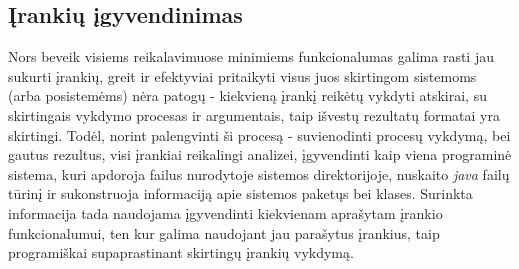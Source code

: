 \subsection{Įrankių įgyvendinimas}
Nors beveik visiems reikalavimuose minimiems funkcionalumas galima rasti jau sukurti įrankių, greit ir efektyviai pritaikyti visus juos skirtingom sistemoms
(arba posistemėms) nėra patogų - kiekvieną įrankį reikėtų vykdyti atskirai, su skirtingais vykdymo procesas ir argumentais, taip išvestų rezultatų formatai yra skirtingi.
Todėl, norint palengvinti ši procesą - suvienodinti procesų vykdymą, bei gautus rezultus, visi įrankiai reikalingi analizei, įgyvendinti kaip viena programinė sistema, kuri
apdoroja failus nurodytoje sistemos direktorijoje, nuskaito \textit{java} failų tūrinį ir sukonstruoja informaciją apie sistemos paketųs bei klases.
Surinkta informacija tada naudojama įgyvendinti kiekvienam aprašytam įrankio funkcionalumui, ten kur galima naudojant jau parašytus įrankius, taip programiškai supaprastinant
skirtingų įrankių vykdymą.
